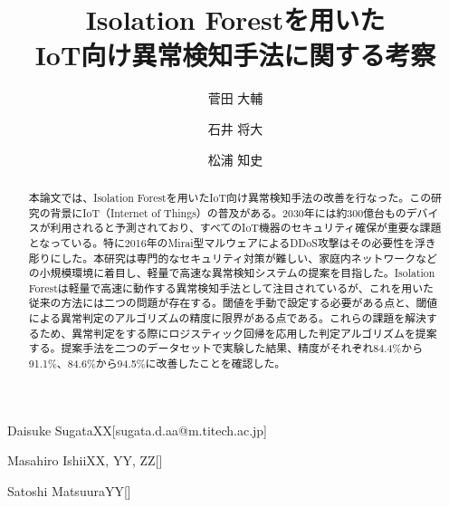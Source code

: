 \documentclass{css}
\begin{document}

\title{Isolation Forestを用いた\\IoT向け異常検知手法に関する考察}



\author{菅田 大輔}{Daisuke Sugata}{XX}[sugata.d.aa@m.titech.ac.jp]
\author{石井 将大}{Masahiro Ishii}{XX, YY, ZZ}[]
\author{松浦 知史}{Satoshi Matsuura}{YY}[]



\begin{abstract}
    本論文では、Isolation Forestを用いたIoT向け異常検知手法の改善を行なった。この研究の背景にIoT（Internet of Things）の普及がある。2030年には約300億台ものデバイスが利用されると予測されており、すべてのIoT機器のセキュリティ確保が重要な課題となっている。特に2016年のMirai型マルウェアによるDDoS攻撃はその必要性を浮き彫りにした。本研究は専門的なセキュリティ対策が難しい、家庭内ネットワークなどの小規模環境に着目し、軽量で高速な異常検知システムの提案を目指した。Isolation Forestは軽量で高速に動作する異常検知手法として注目されているが、これを用いた従来の方法には二つの問題が存在する。閾値を手動で設定する必要がある点と、閾値による異常判定のアルゴリズムの精度に限界がある点である。これらの課題を解決するため、異常判定をする際にロジスティック回帰を応用した判定アルゴリズムを提案する。提案手法を二つのデータセットで実験した結果、精度がそれぞれ84.4\%から91.1\%、84.6\%から94.5\%に改善したことを確認した。
\end{abstract}
\end{document}
